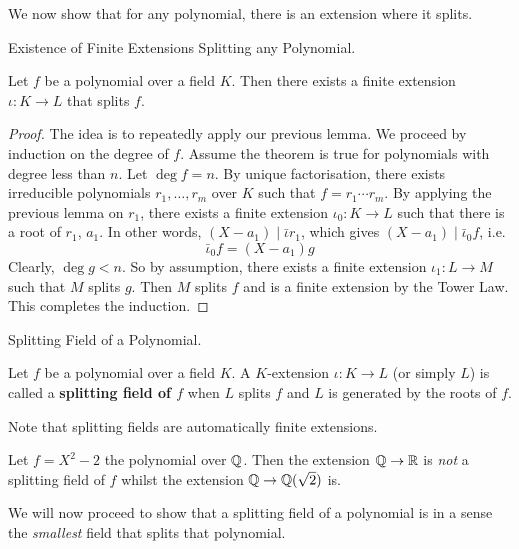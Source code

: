 \documentclass[../book.tex]{subfiles}
\begin{document}
\begin{rmk}
    We now show that for any polynomial, there is an extension where it splits. 
\end{rmk}
\begin{thm} Existence of Finite Extensions Splitting any Polynomial. 
    
    Let $f$ be a polynomial over a field $K$. 
    Then there exists a finite extension $\iota : K \to L$ that splits $f$.
\end{thm}
\begin{proof}
    The idea is to repeatedly apply our previous lemma.
    We proceed by induction on the degree of $f$. 
    Assume the theorem is true for polynomials with degree less than $n$. 
    Let $\deg f = n$.
    By unique factorisation, there exists 
    irreducible polynomials $r_1, \dots, r_m$ over $K$ such that $f = r_1\cdots r_m$.
    By applying the previous lemma on $r_1$, 
    there exists a finite extension $\iota_0 : K \to L$ such that
    there is a root of $r_1$, $a_1$. 
    In other words, $(X - a_1) \mid \bar\iota r_1$, 
    which gives $(X - a_1) \mid \bar\iota_0 f$, i.e. \[
        \bar\iota_0 f = (X - a_1) g
    \]
    Clearly, $\deg g < n$. So by assumption, there exists 
    a finite extension $\iota_1 : L \to M$ such that $M$ splits $g$.
    Then $M$ splits $f$ and is a finite extension by the Tower Law.
    This completes the induction.
\end{proof}
\begin{dfn} Splitting Field of a Polynomial. 
    
    Let $f$ be a polynomial over a field $K$. 
    A $K$-extension $\iota : K \to L$ (or simply $L$) is called 
    a \textbf{splitting field of $f$} when
    $L$ splits $f$ and $L$ is generated by the roots of $f$. 
    
    Note that splitting fields are automatically finite extensions. 
\end{dfn}
\begin{eg}
    Let $f = X^2 - 2$ the polynomial over $\mathbb{Q}$. 
    Then the extension $\mathbb{Q} \to \mathbb{R}$ is \emph{not} a splitting field of $f$
    whilst the extension $\mathbb{Q} \to \mathbb{Q}(\sqrt{2})$ is. 
\end{eg}
\begin{rmk}
    We will now proceed to show that a splitting field of a polynomial 
    is in a sense the \emph{smallest} field that splits that polynomial.
\end{rmk}
\end{document}
